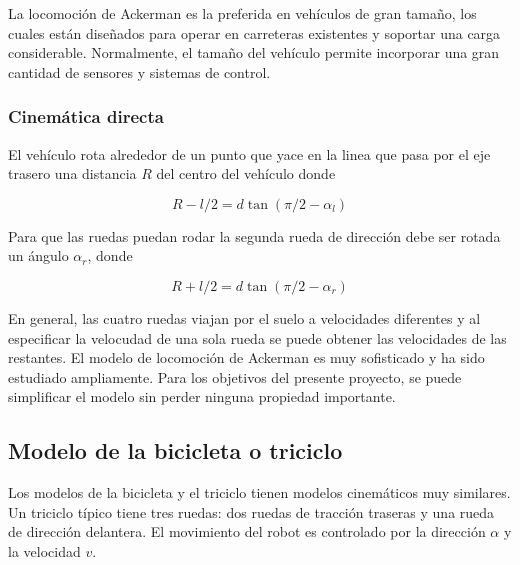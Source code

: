     La locomoción de Ackerman es la preferida en vehículos de gran tamaño, los cuales están diseñados para operar en carreteras
    existentes y soportar una carga considerable. Normalmente, el tamaño del vehículo permite incorporar una gran cantidad 
    de sensores y sistemas de control. 

        \subsubsection{Cinemática directa}
        El vehículo rota alrededor de un punto que yace en la linea que pasa por el eje trasero una distancia $R$ del centro 
        del vehículo donde

        \begin{equation*}
            R - l/2 = d \tan{(\pi / 2 - \alpha_l)}
        \end{equation*}

        Para que las ruedas puedan rodar la segunda rueda de dirección debe ser rotada un ángulo $\alpha_r$, donde 

        \begin{equation*}
            R + l/2 = d \tan{(\pi / 2 - \alpha_r)}
        \end{equation*}

        En general, las cuatro ruedas viajan por el suelo a velocidades diferentes y al especificar la velocudad de una sola rueda
        se puede obtener las velocidades de las restantes. El modelo de locomoción de Ackerman es muy sofisticado y ha sido 
        estudiado ampliamente. Para los objetivos del presente proyecto, se puede simplificar el modelo sin perder ninguna 
        propiedad importante.

    \subsection{Modelo de la bicicleta o triciclo} \label{sec:triciclo}

    Los modelos de la bicicleta y el triciclo tienen modelos cinemáticos muy similares. Un triciclo típico tiene tres ruedas: 
    dos ruedas de tracción traseras y una rueda de dirección delantera. El movimiento del robot es controlado por la dirección 
    $\alpha$ y la velocidad $v$.
    
